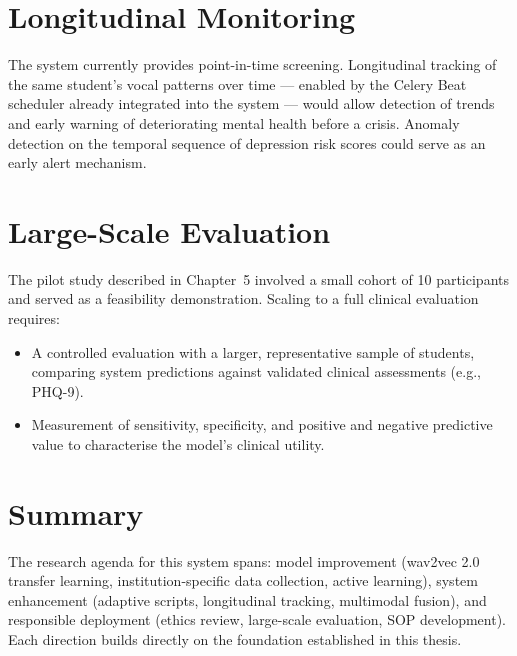 \section{Longitudinal Monitoring}

The system currently provides point-in-time screening. Longitudinal tracking of the same student's vocal patterns over time — enabled by the Celery Beat scheduler already integrated into the system — would allow detection of trends and early warning of deteriorating mental health before a crisis. Anomaly detection on the temporal sequence of depression risk scores could serve as an early alert mechanism.

\section{Large-Scale Evaluation}

The pilot study described in Chapter~5 involved a small cohort of 10 participants and served as a feasibility demonstration. Scaling to a full clinical evaluation requires:
\begin{itemize}
    \item A controlled evaluation with a larger, representative sample of students, comparing system predictions against validated clinical assessments (e.g., PHQ-9).
    \item Measurement of sensitivity, specificity, and positive and negative predictive value to characterise the model's clinical utility.
\end{itemize}

\section{Summary}

The research agenda for this system spans: model improvement (wav2vec 2.0 transfer learning, institution-specific data collection, active learning), system enhancement (adaptive scripts, longitudinal tracking, multimodal fusion), and responsible deployment (ethics review, large-scale evaluation, SOP development). Each direction builds directly on the foundation established in this thesis.
